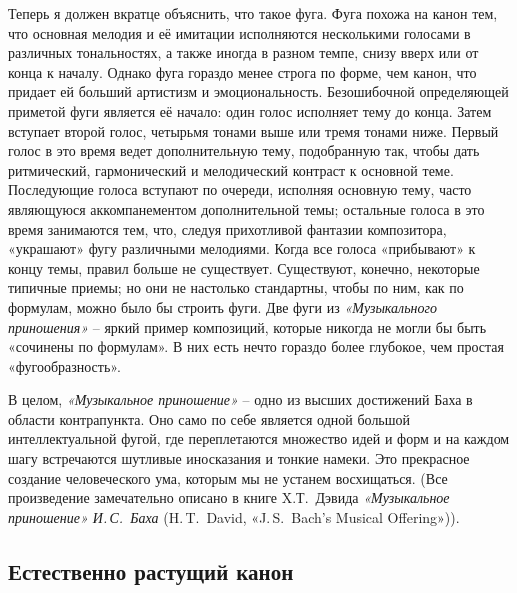 \documentclass[../main.tex]{subfiles}
\begin{document}
Теперь я должен вкратце объяснить, что такое фуга. Фуга похожа на канон тем, что основная мелодия и её имитации исполняются несколькими голосами в различных тональностях, а также иногда в разном темпе, снизу вверх или от конца к началу. Однако фуга гораздо менее строга по форме, чем канон, что придает ей больший артистизм и эмоциональность. Безошибочной определяющей приметой фуги является её начало: один голос исполняет тему до конца. Затем вступает второй голос, четырьмя тонами выше или тремя тонами ниже. Первый голос в это время ведет дополнительную тему, подобранную так, чтобы дать ритмический, гармонический и мелодический контраст к основной теме. Последующие голоса вступают по очереди, исполняя основную тему, часто являющуюся аккомпанементом дополнительной темы; остальные голоса в это время занимаются тем, что, следуя прихотливой фантазии композитора, «украшают» фугу различными мелодиями. Когда все голоса «прибывают» к концу темы, правил больше не существует. Существуют, конечно, некоторые типичные приемы; но они не настолько стандартны, чтобы по ним, как по формулам, можно было бы строить фуги. Две фуги из \emph{«Музыкального приношения»} \--- яркий пример композиций, которые никогда не могли бы быть «сочинены по формулам». В них есть нечто гораздо более глубокое, чем простая «фугообразность».

В целом, \emph{«Музыкальное приношение»} \--- одно из высших достижений Баха в области контрапункта. Оно само по себе является одной большой интеллектуальной фугой, где переплетаются множество идей и форм и на каждом шагу встречаются шутливые иносказания и тонкие намеки. Это прекрасное создание человеческого ума, которым мы не устанем восхищаться. (Все произведение замечательно описано в книге X.Т.~Дэвида \emph{«Музыкальное приношение» И.\,С.~Баха} (H.\,T.~David, «J.\,S.~Bach's Musical Offering»)).


\subsection{Естественно растущий канон}
\end{document}
